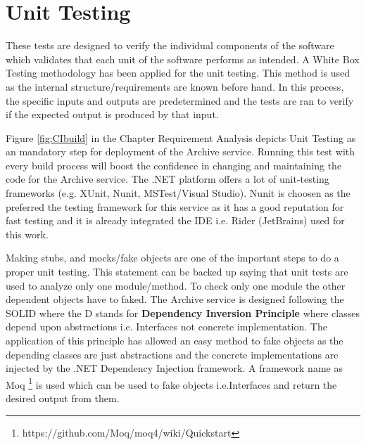 \section{Unit Testing}
These tests are designed to verify the individual components of the software which validates that each unit of the software performs as intended. A White Box
Testing methodology has been applied for the unit testing. This method is used as the internal structure/requirements are known before hand. In this process,
the specific inputs and outputs are predetermined and the tests are ran to verify if the expected output is produced by that input. 

\par
Figure \ref{fig:CIbuild} in the Chapter Requirement Analysis depicts
Unit Testing as an mandatory step for deployment of the Archive service. Running this test with every build process will boost the confidence 
in changing and maintaining the code for the Archive service. The .NET platform offers a lot of unit-testing frameworks 
(e.g. XUnit, Nunit, MSTest/Visual Studio). Nunit is choosen as the preferred the testing framework for this service as it has a good reputation for
fast testing and it is already integrated the IDE i.e. Rider (JetBrains) used for this work. 

\par
Making stubs, and mocks/fake objects are one of the important steps to do a proper unit testing. This statement can be backed up saying that unit tests are
used to analyze only one module/method. To check only one module the other dependent objects have to faked. The Archive service is designed following the
SOLID \cite{Hotop2015} where the D stands for \textbf{Dependency Inversion Principle} where classes depend upon abstractions i.e. Interfaces not concrete
implementation. The application of this principle has allowed an easy method to fake objects as the depending classes are just abstractions and the concrete 
implementations are injected by the .NET Dependency Injection framework. A framework name as Moq \footnote{https://github.com/Moq/moq4/wiki/Quickstart} is used
which can be used to fake objects i.e.Interfaces and return the desired output from them. 

